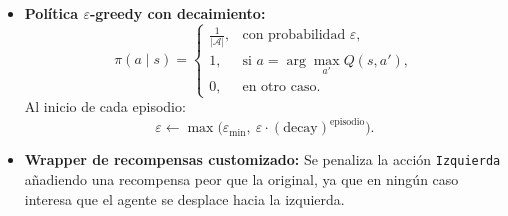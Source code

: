 \begin{itemize}
  \item \textbf{Política \(\varepsilon\)-greedy con decaimiento:}
    \[
      \pi(a \mid s) = 
      \begin{cases}
        \frac{1}{|\mathcal{A}|}, & \text{con probabilidad } \varepsilon,\\
        1, & \text{si } a = \arg\max_{a'}Q(s,a'),\\
        0, & \text{en otro caso.}
      \end{cases}
    \]
    Al inicio de cada episodio:
    \[
      \varepsilon \leftarrow \max\bigl(\varepsilon_{\min},\ \varepsilon \cdot (\text{decay})^{\text{episodio}}\bigr).
    \]
  \item \textbf{Wrapper de recompensas customizado:}
    Se penaliza la acción \texttt{Izquierda} añadiendo una recompensa peor que la original, ya que en ningún caso interesa que el agente se desplace hacia la izquierda.
\end{itemize}
